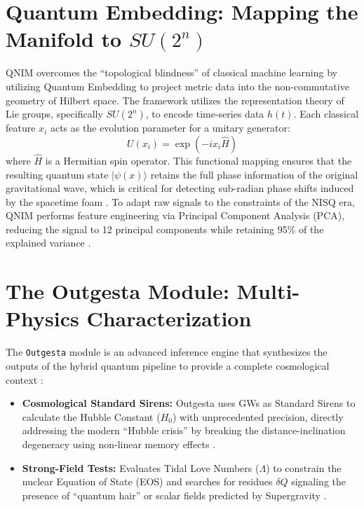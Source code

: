 \documentclass[11pt,a4paper,spanish]{book}
\numberwithin{equation}{chapter}
\numberwithin{figure}{chapter}
\numberwithin{equation}{chapter}
\numberwithin{figure}{chapter}
\numberwithin{table}{chapter}
\begin{document}
\section{Quantum Embedding: Mapping the Manifold to $SU(2^n)$}

QNIM overcomes the ``topological blindness'' of classical machine learning by utilizing Quantum Embedding to project metric data into the non-commutative geometry of Hilbert space. The framework utilizes the representation theory of Lie groups, specifically $SU(2^n)$, to encode time-series data $h(t)$. Each classical feature $x_i$ acts as the evolution parameter for a unitary generator:
\begin{equation}
    U(x_i) = \exp(-i x_i \hat{H})
\end{equation}
where $\hat{H}$ is a Hermitian spin operator. This functional mapping ensures that the resulting quantum state $|\psi(x)\rangle$ retains the full phase information of the original gravitational wave, which is critical for detecting sub-radian phase shifts induced by the spacetime foam \cite{arxiv251003389}. To adapt raw signals to the constraints of the NISQ era, QNIM performs feature engineering via Principal Component Analysis (PCA), reducing the signal to 12 principal components while retaining 95\% of the explained variance \cite{arxiv251003389}.

\section{The Outgesta Module: Multi-Physics Characterization}

The \texttt{Outgesta} module is an advanced inference engine that synthesizes the outputs of the hybrid quantum pipeline to provide a complete cosmological context \cite{scispace_bayesian}:
\begin{itemize}
    \item \textbf{Cosmological Standard Sirens:} Outgesta uses GWs as Standard Sirens to calculate the Hubble Constant ($H_0$) with unprecedented precision, directly addressing the modern ``Hubble crisis'' by breaking the distance-inclination degeneracy using non-linear memory effects \cite{arxiv250220584}.
    \item \textbf{Strong-Field Tests:} Evaluates Tidal Love Numbers ($\Lambda$) to constrain the nuclear Equation of State (EOS) and searches for residues $\delta Q$ signaling the presence of ``quantum hair'' or scalar fields predicted by Supergravity \cite{loop_quantum_signatures, testing_quantum_bh}.
\end{itemize}
\end{document}
